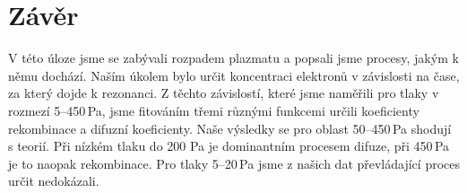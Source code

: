 \documentclass[a4paper,12pt]{article}
\begin{document}
\section{Závěr}
V této úloze jsme se zabývali rozpadem plazmatu a popsali jsme procesy, jakým k 
němu dochází. Naším úkolem bylo určit koncentraci elektronů v závislosti na 
čase, za který dojde k rezonanci. Z těchto závislostí, které jsme naměřili pro 
tlaky v rozmezí 5--450\,Pa, jsme fitováním třemi různými funkcemi určili 
koeficienty rekombinace a difuzní koeficienty. Naše výsledky se pro oblast 
50--450\,Pa shodují s teorií. Při nízkém tlaku do 200 Pa je dominantním 
procesem difuze, při 450\,Pa je to naopak rekombinace. Pro tlaky 5--20\,Pa jsme 
z našich dat převládající proces určit nedokázali.
\end{document}
